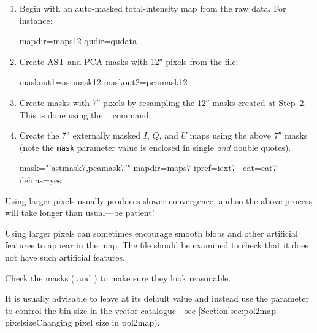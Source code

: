 \begin{enumerate}
\item Begin with an auto-masked total-intensity map from the raw
  data. For instance:

\begin{terminalv}
     mapdir=maps12 qudir=qudata
\end{terminalv}


\item Create AST and PCA masks with 12\si{\arcsecond} pixels from the
   file:


\begin{terminalv}
     maskout1=astmask12 maskout2=pcamask12
\end{terminalv}

\item Create masks with 7\si{\arcsecond} pixels by resampling the
  12\si{\arcsecond} masks created at Step~2. This is done using the
  \Kappa\  command:

\begin{terminalv}
\end{terminalv}

\item Create the 7\si{\arcsecond} externally masked $I$, $Q$, and $U$ maps
  using the above 7\si{\arcsecond} masks (note the \texttt{mask}
  parameter value is enclosed in single \emph{and} double quotes).

\begin{terminalv}
                  mask="'astmask7,pcamask7'" mapdir=maps7 ipref=iext7  \
                  cat=cat7 debias=yes
\end{terminalv}
\end{enumerate}

\begin{tip}
  Using larger pixels usually produces slower convergence, and so the
  above process will take longer than usual---be patient!

  Using larger pixels can sometimes encourage smooth blobs and other
  artificial features to appear in the map. The \file{iauto12.sdf} file
  should be examined to check that it does not have such artificial
  features.

  Check the masks ( and ) to make sure they
  look reasonable.

  It is usually advisable to leave  at its default value
  and instead use the \param{BINSIZE} parameter to control the bin size in
  the vector catalogue---see \cref{Section}{sec:pol2map-pixelsize}{Changing pixel size in pol2map}).
\end{tip}

